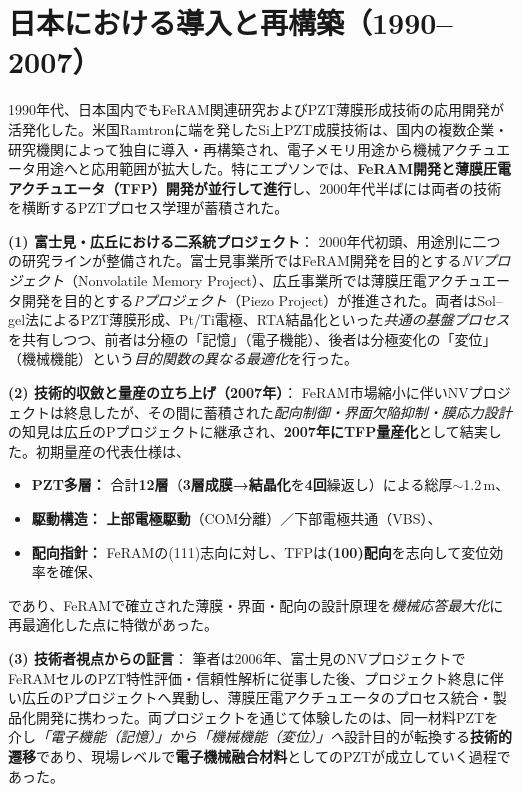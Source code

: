 \documentclass[conference]{IEEEtran}
\begin{document}
\section{日本における導入と再構築（1990--2007）}
1990年代、日本国内でもFeRAM関連研究およびPZT薄膜形成技術の応用開発が活発化した。米国Ramtronに端を発したSi上PZT成膜技術は、国内の複数企業・研究機関によって独自に導入・再構築され、電子メモリ用途から機械アクチュエータ用途へと応用範囲が拡大した。特にエプソンでは、\textbf{FeRAM開発と薄膜圧電アクチュエータ（TFP）開発が並行して進行}し、2000年代半ばには両者の技術を横断するPZTプロセス学理が蓄積された。

\medskip
\noindent
\textbf{(1) 富士見・広丘における二系統プロジェクト}：
2000年代初頭、用途別に二つの研究ラインが整備された。富士見事業所ではFeRAM開発を目的とする\textit{NVプロジェクト}（Nonvolatile Memory Project）、広丘事業所では薄膜圧電アクチュエータ開発を目的とする\textit{Pプロジェクト}（Piezo Project）が推進された。両者はSol--gel法によるPZT薄膜形成、Pt/Ti電極、RTA結晶化といった\emph{共通の基盤プロセス}を共有しつつ、前者は分極の「記憶」（電子機能）、後者は分極変化の「変位」（機械機能）という\emph{目的関数の異なる最適化}を行った。

\medskip
\noindent
\textbf{(2) 技術的収斂と量産の立ち上げ（2007年）}：
FeRAM市場縮小に伴いNVプロジェクトは終息したが、その間に蓄積された\emph{配向制御・界面欠陥抑制・膜応力設計}の知見は広丘のPプロジェクトに継承され、\textbf{2007年にTFP量産化}として結実した。初期量産の代表仕様は、
\begin{itemize}\setlength\itemsep{2pt}
  \item \textbf{PZT多層：} 合計\textbf{12層}（\textbf{3層成膜→結晶化}を\textbf{4回}繰返し）による総厚$\sim$1.2\,\textmu m、
  \item \textbf{駆動構造：} \textbf{上部電極駆動}（COM分離）／下部電極共通（VBS）、
  \item \textbf{配向指針：} FeRAMの(111)志向に対し、TFPは\textbf{(100)配向}を志向して変位効率を確保、
\end{itemize}
であり、FeRAMで確立された薄膜・界面・配向の設計原理を\emph{機械応答最大化}に再最適化した点に特徴があった。

\medskip
\noindent
\textbf{(3) 技術者視点からの証言}：
筆者は2006年、富士見のNVプロジェクトでFeRAMセルのPZT特性評価・信頼性解析に従事した後、プロジェクト終息に伴い広丘のPプロジェクトへ異動し、薄膜圧電アクチュエータのプロセス統合・製品化開発に携わった。両プロジェクトを通じて体験したのは、同一材料PZTを介し\emph{「電子機能（記憶）」から「機械機能（変位）」へ}設計目的が転換する\textbf{技術的遷移}であり、現場レベルで\textbf{電子機械融合材料}としてのPZTが成立していく過程であった。
\end{document}
